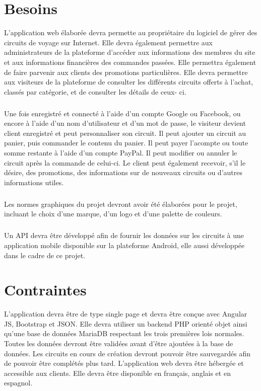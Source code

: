 \documentclass{scrreprt}
\begin{document}
\chapter{Besoins}
L’application web élaborée devra permette au propriétaire du logiciel de gérer
des circuits de voyage sur Internet. Elle devra également permettre aux
administrateurs de la plateforme d’accéder aux informations des membres du site
et aux informations financières des commandes passées. Elle permettra également
de faire parvenir aux clients des promotions particulières. Elle devra
permettre aux visiteurs de la plateforme de consulter les différents circuits
offerts à l’achat, classés par catégorie, et de consulter les détails de ceux-
ci.

\paragraph{}
Une fois enregistré et connecté à l’aide d’un compte Google ou Facebook, ou
encore à l’aide d’un nom d’utilisateur et d’un mot de passe, le visiteur
devient client enregistré et peut personnaliser son circuit. Il peut ajouter un
circuit au panier, puis commander le contenu du panier. Il peut payer l’acompte
ou toute somme restante à l’aide d’un compte PayPal. Il peut modifier ou
annuler le circuit après la commande de celui-ci. Le client peut également
recevoir, s’il le désire, des promotions, des informations sur de nouveaux
circuits ou d’autres informations utiles.

\paragraph{}
Les normes graphiques du projet devront avoir été élaborées pour le projet,
incluant le choix d’une marque, d’un logo et d’une palette de couleurs.

\paragraph{}
Un API devra être développé afin de fournir les données sur les circuits à une
application mobile disponible sur la plateforme Android, elle aussi développée
dans le cadre de ce projet.


\chapter{Contraintes}
L’application devra être de type single page et devra être conçue avec Angular
JS, Bootstrap et JSON. Elle devra utiliser un backend PHP orienté objet ainsi
qu’une base de données MariaDB respectant les trois premières lois normales.
Toutes les données devront être validées avant d’être ajoutées à la base
de données. Les circuits en cours de création devront pouvoir être sauvegardés
afin de pouvoir être complétés plus tard. L’application web devra être hébergée
et accessible aux clients. Elle devra être disponible en français, anglais et
en espagnol.
\end{document}
